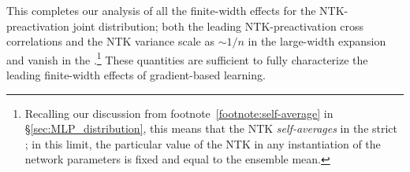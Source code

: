 This completes our analysis of all the finite-width effects for the NTK-preactivation joint distribution; both the leading NTK-preactivation cross correlations and the NTK variance scale as $\sim 1/n$ in the large-width expansion and vanish in the .\footnote{
    Recalling our discussion from footnote~\ref{footnote:self-average} in \S\ref{sec:MLP_distribution}, this means that the NTK \emph{self-averages} in the strict ; in this limit, the particular value of the NTK in any instantiation of the network parameters is fixed and equal to the ensemble mean.
} 
These quantities are sufficient to fully characterize the leading finite-width effects of gradient-based learning.









